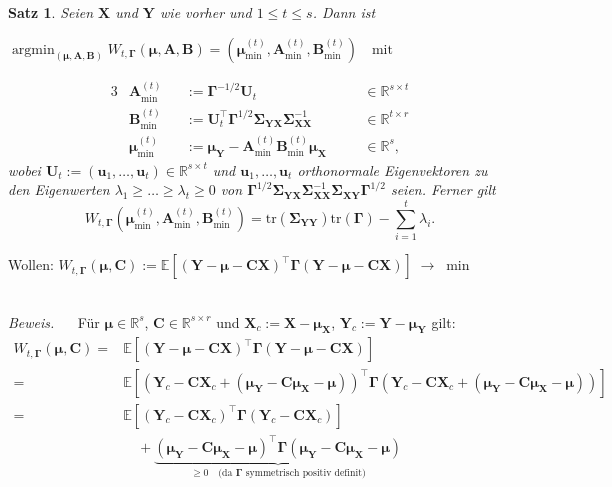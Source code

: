 \documentclass[12pt, aspectratio=169]{beamer}
\newcommand{\E}{\mathbb{E}}
\newcommand{\R}{\mathbb{R}}
\newcommand{\X}{\mathbf{X}}
\newcommand{\Y}{\mathbf{Y}}
\newcommand{\muu}{\bm{\mu}}
\newcommand{\Ssigma}{\bm{\Sigma}}
\newcommand{\uu}{\mathbf{u}}
\newcommand{\C}{\mathbf{C}}
\newcommand{\A}{\mathbf{A}}
\newcommand{\B}{\mathbf{B}}
\newcommand{\Ggamma}{\bm{\Gamma}}
\newcommand{\tr}{\mathrm{tr}}
\DeclareMathOperator*{\argmin}{argmin}
\newtheorem{dtheorem}[ddefinition]{Satz}
\begin{document}
\begin{frame}
\begin{dtheorem}
	\label{thm:rrr}
	Seien $\X$ und $\Y$ wie vorher und $1 \leq t \leq s$. Dann ist
	\begin{center}
		$\argmin_{(\muu, \A, \B)} W_{t, \Ggamma}(\muu, \A, \B) = (\muu^{(t)}_{\min}, \A^{(t)}_{\min}, \B^{(t)}_{\min}) \quad  \text{mit}$
	\end{center}
	\begin{alignat*}{3}
	&\A^{(t)}_{\min}   &&:= \Ggamma^{-1/2} \mathbf{U}_t                                       &&\quad \in \R^{s \times t} \\
	&\B^{(t)}_{\min}   &&:= \mathbf{U}_t^\top \Ggamma^{1/2} \Ssigma_{\Y\X}\Ssigma_{\X\X}^{-1} &&\quad \in \R^{t \times r} \\
	&\muu^{(t)}_{\min} &&:= \muu_\Y - \A^{(t)}_{\min} \B^{(t)}_{\min} \muu_\X                 &&\quad \in \R^s \text{,}
	\end{alignat*}
	wobei $\mathbf{U}_t := (\uu_1,\dots, \uu_t) \in \R^{s \times t}$ und $\uu_1,\dots, \uu_t$ orthonormale Eigenvektoren zu den Eigenwerten $\lambda_1 \geq \dots \geq \lambda_t \geq 0$ von $\Ggamma^{1/2} \Ssigma_{\Y\X} \Ssigma_{\X\X}^{-1} \Ssigma_{\X\Y} \Ggamma^{1/2}$ seien.
	Ferner gilt
	$$W_{t, \Ggamma}(\muu^{(t)}_{\min}, \A^{(t)}_{\min}, \B^{(t)}_{\min}) = \tr(\Ssigma_{\Y\Y}) \tr(\Ggamma) - \sum_{i=1}^{t} \lambda_i \text{.}$$
\end{dtheorem}
\end{frame}

\begin{frame}
	\begin{alertblock}{}
		\begin{center}
			Wollen: $ W_{t, \Ggamma}(\muu, \C) := \E[(\Y - \muu - \C \X)^{\top} \Ggamma (\Y - \muu - \C \X)] \; \rightarrow \; \min$
		\end{center}
	\end{alertblock}
$\;$ \\
	\textit{Beweis.} $\quad$ 
	Für $\muu \in \R^s$, $\C \in \R^{s \times r}$ und $\X_c := \X - \muu_\X$, $\Y_c := \Y - \muu_\Y$ gilt: 
	\begin{align*}
	W_{t, \Ggamma}(\muu, \C) ={}& \E[(\Y - \muu - \C \X)^\top \Ggamma (\Y - \muu - \C \X)] \\
	={}& \E[(\Y_c - \C \X_c + (\muu_\Y - \C \muu_\X - \muu))^\top \Ggamma (\Y_c - \C \X_c + (\muu_\Y - \C \muu_\X - \muu))] \\
	={}& \E[(\Y_c - \C \X_c)^\top \Ggamma (\Y_c - \C \X_c)] \\
	& \quad + \underbrace{(\muu_\Y - \C \muu_\X - \muu)^\top \Ggamma (\muu_\Y - \C \muu_\X - \muu)}_{\geq 0 \quad \text{(da } \Ggamma \text{ symmetrisch positiv definit)}}
	\end{align*}
\end{frame}
\end{document}
